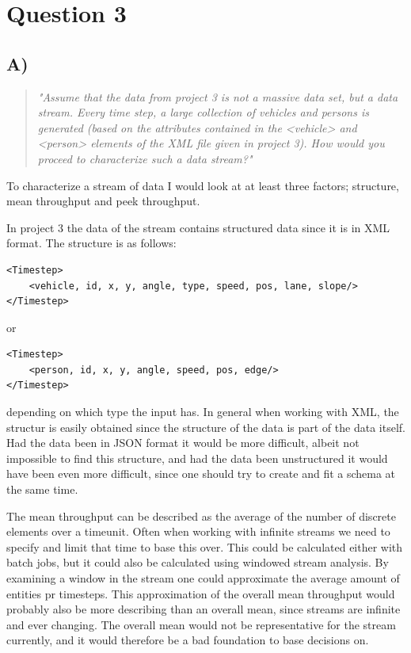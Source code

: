 \section{Question 3}

\subsection{A)}
\begin{quote}
	\textit{"Assume	that	the	data	from	project	3	is	not	a	massive	data	set,	but	a	data	stream.	Every	time	step,	a	large	collection	of	vehicles	and	persons	is	generated	(based	on	the	attributes	contained	in	the	<vehicle>	and	<person>	elements	of	the	XML	file	given	in	project	3).	How	would	you	proceed	to	characterize	such	a	data	stream?"}
\end{quote}
To characterize a stream of data I would look at at least three factors; structure, mean throughput and peek throughput. 

In project 3 the data of the stream contains structured data since it is in XML format. The structure is as follows:
\begin{verbatim}
<Timestep>
    <vehicle, id, x, y, angle, type, speed, pos, lane, slope/>
</Timestep>
\end{verbatim}
or 
\begin{verbatim}
<Timestep>
    <person, id, x, y, angle, speed, pos, edge/>
</Timestep>
\end{verbatim}
depending on which type the input has. In general when working with XML, the structur is easily obtained since the structure of the data is part of the data itself. Had the data been in JSON format it would be more difficult, albeit not impossible to find this structure, and had the data been unstructured it would have been even more difficult, since one should try to create and fit a schema at the same time.

The mean throughput can be described as the average of the number of discrete elements over a timeunit. Often when working with infinite streams we need to specify and limit that time to base this over. This could be calculated either with batch jobs, but it could also be calculated using windowed stream analysis. By examining a window in the stream one could approximate the average amount of entities pr timesteps. This approximation of the overall mean throughput would probably also be more describing than an overall mean, since streams are infinite and ever changing. The overall mean would not be representative for the stream currently, and it would therefore be a bad foundation to base decisions on.

